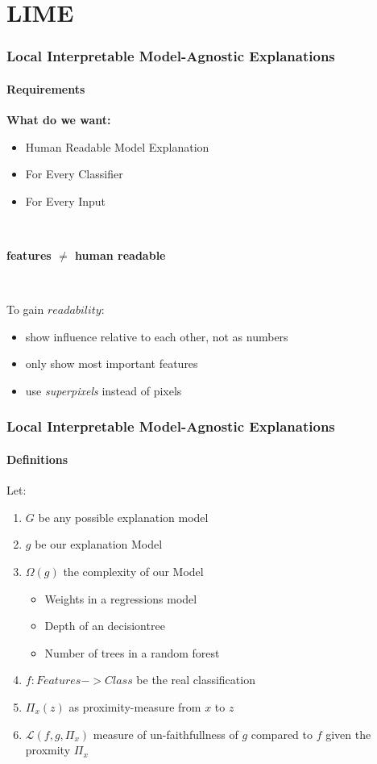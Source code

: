 \section{LIME}
\begin{frame}
	\frametitle{Local Interpretable Model-Agnostic Explanations}
	\framesubtitle{Requirements}
	\begin{Large}
		\textbf{What do we want:}
		\begin{itemize}
			\item Human Readable Model Explanation
			\item For Every Classifier
			\item For Every Input
		\end{itemize}
	~\newline
	\begin{center}
		\textbf{ features $\neq$ human readable }
	\end{center}
	~\newline
	\end{Large}
	To gain $readability$: 
	\begin{itemize}
		\item show influence relative to each other, not as numbers
		\item only show most important features
		\item use \textit{superpixels} instead of pixels
	\end{itemize}
\end{frame}

\begin{frame}
	\frametitle{Local Interpretable Model-Agnostic Explanations}
	\framesubtitle{Definitions}
	Let:
	\begin{enumerate}
		\item $G$ be any possible explanation model
		\item $g$ be our explanation Model
		\item $\Omega(g)$ the complexity of our Model
		\begin{itemize}
			\item Weights in a regressions model
			\item Depth of an decisiontree
			\item Number of trees in a random forest
		\end{itemize}
		\item $f: Features -> Class $ be the real classification
		\item $\Pi_x(z)$ as proximity-measure from $x$ to $z$
		\item $\mathcal{L}(f,g,\Pi_x)$ measure of un-faithfullness of $g$ compared to $f$ given the proxmity $\Pi_x$
	\end{enumerate}
\end{frame}

